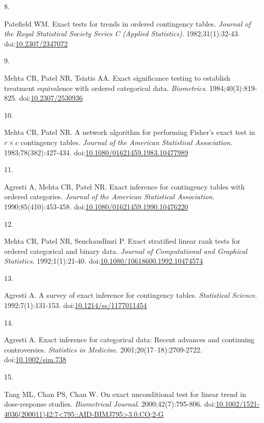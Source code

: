 \documentclass[
  11pt,
]{article}
\newlength{\cslhangindent}
\newlength{\csllabelwidth}
\newenvironment{CSLReferences}[2] %
 {\begin{list}{}{%
  \setlength{\itemindent}{0pt}
  \setlength{\leftmargin}{0pt}
  \setlength{\parsep}{0pt}
  \ifodd #1
   \setlength{\leftmargin}{\cslhangindent}
   \setlength{\itemindent}{-1\cslhangindent}
  \fi
  \setlength{\itemsep}{#2\baselineskip}}}
 {\end{list}}
\newcommand{\CSLLeftMargin}[1]{\parbox[t]{\csllabelwidth}{\strut#1\strut}}
\newcommand{\CSLRightInline}[1]{\parbox[t]{\linewidth - \csllabelwidth}{\strut#1\strut}}
\begin{document}
\begin{CSLReferences}{0}{1}
\CSLLeftMargin{8. }%
\CSLRightInline{Patefield WM. Exact tests for trends in ordered contingency tables. \emph{Journal of the Royal Statistical Society Series C (Applied Statistics)}. 1982;31(1):32-43. doi:\href{https://doi.org/10.2307/2347072}{10.2307/2347072}}

\CSLLeftMargin{9. }%
\CSLRightInline{Mehta CR, Patel NR, Tsiatis AA. Exact significance testing to establish treatment equivalence with ordered categorical data. \emph{Biometrics}. 1984;40(3):819-825. doi:\href{https://doi.org/10.2307/2530936}{10.2307/2530936}}

\CSLLeftMargin{10. }%
\CSLRightInline{Mehta CR, Patel NR. A network algorithm for performing {Fisher}'s exact test in \(r \times c\) contingency tables. \emph{Journal of the American Statistical Association}. 1983;78(382):427-434. doi:\href{https://doi.org/10.1080/01621459.1983.10477989}{10.1080/01621459.1983.10477989}}

\CSLLeftMargin{11. }%
\CSLRightInline{Agresti A, Mehta CR, Patel NR. Exact inference for contingency tables with ordered categories. \emph{Journal of the American Statistical Association}. 1990;85(410):453-458. doi:\href{https://doi.org/10.1080/01621459.1990.10476220}{10.1080/01621459.1990.10476220}}

\CSLLeftMargin{12. }%
\CSLRightInline{Mehta CR, Patel NR, Senchaudhuri P. Exact stratified linear rank tests for ordered categorical and binary data. \emph{Journal of Computational and Graphical Statistics}. 1992;1(1):21-40. doi:\href{https://doi.org/10.1080/10618600.1992.10474574}{10.1080/10618600.1992.10474574}}

\CSLLeftMargin{13. }%
\CSLRightInline{Agresti A. A survey of exact inference for contingency tables. \emph{Statistical Science}. 1992;7(1):131-153. doi:\href{https://doi.org/10.1214/ss/1177011454}{10.1214/ss/1177011454}}

\CSLLeftMargin{14. }%
\CSLRightInline{Agresti A. Exact inference for categorical data: Recent advances and continuing controversies. \emph{Statistics in Medicine}. 2001;20(17--18):2709-2722. doi:\href{https://doi.org/10.1002/sim.738}{10.1002/sim.738}}

\CSLLeftMargin{15. }%
\CSLRightInline{Tang ML, Chan PS, Chan W. On exact unconditional test for linear trend in dose-response studies. \emph{Biometrical Journal}. 2000;42(7):795-806. doi:\href{https://doi.org/10.1002/1521-4036(200011)42:7\%3C795::AID-BIMJ795\%3E3.0.CO;2-G}{10.1002/1521-4036(200011)42:7\textless795::AID-BIMJ795\textgreater3.0.CO;2-G}}


\end{CSLReferences}
\end{document}
